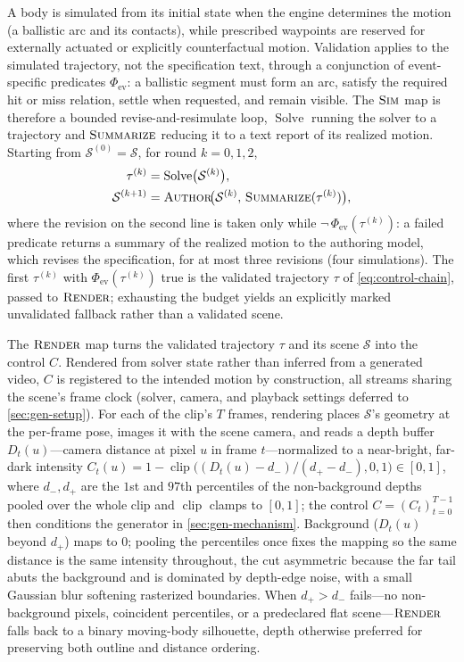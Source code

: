 A body is simulated from its initial state when the engine determines the motion (a ballistic arc and
its contacts), while prescribed waypoints are reserved for externally actuated or explicitly
counterfactual motion. Validation applies to the simulated trajectory, not the specification text,
through a conjunction of event-specific predicates $\Phi_{\mathrm{ev}}$: a ballistic segment must form
an arc, satisfy the required hit or miss relation, settle when requested, and remain visible. The
$\textsc{Sim}$ map is therefore a bounded revise-and-resimulate loop, $\operatorname{Solve}$ running
the solver to a trajectory and $\textsc{Summarize}$ reducing it to a text report of its realized
motion. Starting from $\mathcal{S}^{(0)}=\mathcal{S}$, for round $k=0,1,2$,
\begin{equation}
\begin{aligned}
\tau^{(k)} &= \operatorname{Solve}\!\big(\mathcal{S}^{(k)}\big),\\
\mathcal{S}^{(k+1)} &= \textsc{Author}\!\big(\mathcal{S}^{(k)},\, \textsc{Summarize}(\tau^{(k)})\big),
\end{aligned}
\label{eq:scene-validate}
\end{equation}
where the revision on the second line is taken only while $\neg\,\Phi_{\mathrm{ev}}(\tau^{(k)})$: a
failed predicate returns a summary of the realized motion to the authoring model, which revises the
specification, for at most three revisions (four simulations). The first $\tau^{(k)}$ with
$\Phi_{\mathrm{ev}}(\tau^{(k)})$ true is the validated trajectory $\tau$ of \cref{eq:control-chain},
passed to $\textsc{Render}$; exhausting the budget yields an explicitly marked unvalidated fallback
rather than a validated scene.

The $\textsc{Render}$ map turns the validated trajectory $\tau$ and its scene $\mathcal{S}$ into the
control $C$. Rendered from solver state rather than inferred from a generated video, $C$ is registered
to the intended motion by construction, all streams sharing the scene's frame clock (solver, camera,
and playback settings deferred to \cref{sec:gen-setup}). For each of the clip's $T$ frames, rendering
places $\mathcal{S}$'s geometry at the per-frame pose, images it with the scene camera, and reads a
depth buffer $D_t(u)$---camera distance at pixel $u$ in frame $t$---normalized to a near-bright,
far-dark intensity $C_t(u)=1-\operatorname{clip}\big((D_t(u)-d_-)/(d_+-d_-),0,1\big)\in[0,1]$, where
$d_-,d_+$ are the $1$st and $97$th percentiles of the non-background depths pooled over the whole clip
and $\operatorname{clip}$ clamps to $[0,1]$; the control $C=(C_t)_{t=0}^{T-1}$ then conditions the
generator in \cref{sec:gen-mechanism}. Background ($D_t(u)$
beyond $d_+$) maps to $0$; pooling the percentiles once fixes the mapping so the same distance is the
same intensity throughout, the cut asymmetric because the far tail abuts the background and is
dominated by depth-edge noise, with a small Gaussian blur softening rasterized boundaries. When
$d_+>d_-$ fails---no non-background pixels, coincident percentiles, or a predeclared flat
scene---$\textsc{Render}$ falls back to a binary moving-body silhouette, depth otherwise preferred for
preserving both outline and distance ordering.

